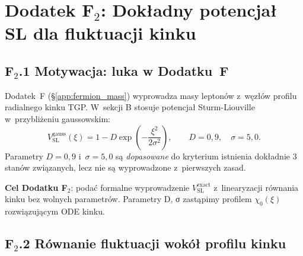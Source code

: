 %
%

\section*{Dodatek F$_2$: Dokładny potencjał SL dla fluktuacji kinku}
\label{app:wkb_exact}

\subsection*{F$_2$.1 Motywacja: luka w Dodatku~F}

Dodatek~F (§\ref{app:fermion_mass}) wyprowadza masy leptonów
z~węzłów profilu radialnego kinku TGP.
W~sekcji B stosuje potencjał Sturm-Liouville w~przybliżeniu
gaussowskim:
\begin{equation}
  V_\mathrm{SL}^\mathrm{gauss}(\xi)
  = 1 - D\exp\!\left(-\frac{\xi^2}{2\sigma^2}\right),
  \qquad D = 0{,}9,\quad \sigma = 5{,}0.
  \label{eq:V_gauss}
\end{equation}
Parametry $D = 0{,}9$ i~$\sigma = 5{,}0$ są \emph{dopasowane}
do kryterium istnienia dokładnie 3 stanów związanych, lecz
nie są wyprowadzone z~pierwszych zasad.

\textbf{Cel Dodatku F$_2$}: podać formalne wyprowadzenie
$V_\mathrm{SL}^\mathrm{exact}$ z~linearyzacji równania kinku
bez wolnych parametrów. Parametry D, σ zastąpimy profilem
$\chi_0(\xi)$ rozwiązującym ODE kinku.

\subsection*{F$_2$.2 Równanie fluktuacji wokół profilu kinku}

